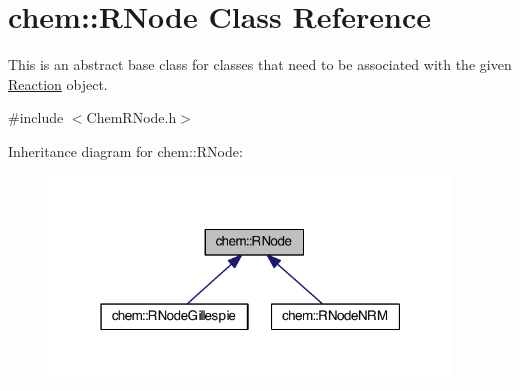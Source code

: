 \hypertarget{classchem_1_1RNode}{\section{chem\-:\-:R\-Node Class Reference}
\label{classchem_1_1RNode}
}


This is an abstract base class for classes that need to be associated with the given \hyperlink{classchem_1_1Reaction}{Reaction} object.  




{\ttfamily \#include $<$Chem\-R\-Node.\-h$>$}



Inheritance diagram for chem\-:\-:R\-Node\-:\nopagebreak
\begin{figure}[H]
\begin{center}
\leavevmode
\includegraphics[width=304pt]{classchem_1_1RNode__inherit__graph}
\end{center}
\end{figure}
